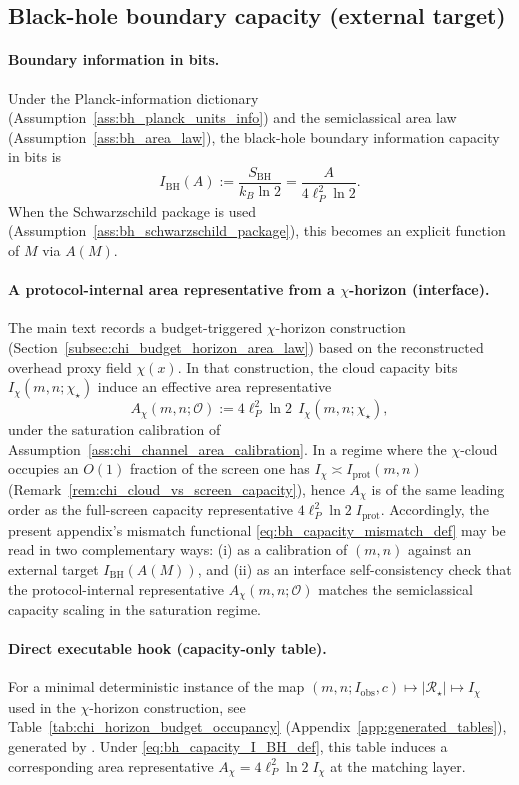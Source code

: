 \subsection{Black-hole boundary capacity (external target)}
\label{subsec:bh_capacity_bh}

\paragraph{Boundary information in bits.}
\MatchTag Under the Planck-information dictionary (Assumption~\ref{ass:bh_planck_units_info}) and the semiclassical area law (Assumption~\ref{ass:bh_area_law}),
the black-hole boundary information capacity in bits is
\begin{equation}
\label{eq:bh_capacity_I_BH_def}
I_{\mathrm{BH}}(A)
:=
\frac{S_{\mathrm{BH}}}{k_B\ln 2}
=
\frac{A}{4\ell_P^2\ln 2}.
\end{equation}
When the Schwarzschild package is used (Assumption~\ref{ass:bh_schwarzschild_package}), this becomes an explicit function of $M$ via $A(M)$.

\paragraph{A protocol-internal area representative from a $\chi$-horizon (interface).}
\InterfaceTag The main text records a budget-triggered $\chi$-horizon construction (Section~\ref{subsec:chi_budget_horizon_area_law}) based on the reconstructed overhead proxy field $\chi(x)$.
In that construction, the cloud capacity bits $I_{\chi}(m,n;\chi_\star)$ induce an effective area representative
\[
A_{\chi}(m,n;\mathcal O):=4\ell_P^2\ln 2\;\, I_{\chi}(m,n;\chi_\star),
\]
under the saturation calibration of Assumption~\ref{ass:chi_channel_area_calibration}.
\MatchTag In a regime where the $\chi$-cloud occupies an $O(1)$ fraction of the screen one has $I_{\chi}\asymp I_{\mathrm{prot}}(m,n)$ (Remark~\ref{rem:chi_cloud_vs_screen_capacity}), hence $A_{\chi}$ is of the same leading order as the full-screen capacity representative $4\ell_P^2\ln 2\;I_{\mathrm{prot}}$.
Accordingly, the present appendix's mismatch functional \eqref{eq:bh_capacity_mismatch_def} may be read in two complementary ways: (i) as a calibration of $(m,n)$ against an external target $I_{\mathrm{BH}}(A(M))$, and (ii) as an interface self-consistency check that the protocol-internal representative $A_{\chi}(m,n;\mathcal O)$ matches the semiclassical capacity scaling in the saturation regime.

\paragraph{Direct executable hook (capacity-only table).}
\AuditTag For a minimal deterministic instance of the map $(m,n;I_{\mathrm{obs}},c)\mapsto |{\mathcal R}_\star|\mapsto I_\chi$ used in the $\chi$-horizon construction, see Table~\ref{tab:chi_horizon_budget_occupancy} (Appendix~\ref{app:generated_tables}), generated by .
Under \eqref{eq:bh_capacity_I_BH_def}, this table induces a corresponding area representative $A_\chi=4\ell_P^2\ln 2\;I_\chi$ at the matching layer.


